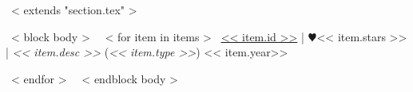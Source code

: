 ~< extends "section.tex" >~

~< block body >~
  ~< for item in items >~
    \href{<< item.repo_url >>}{<< item.id >>} | \small{$\varheart$}<< item.stars >> |
    \emph{<< item.desc >>} \small{(\textit{<< item.type >>})} \hfill
    << item.year>> \par
  ~< endfor >~
~< endblock body >~
